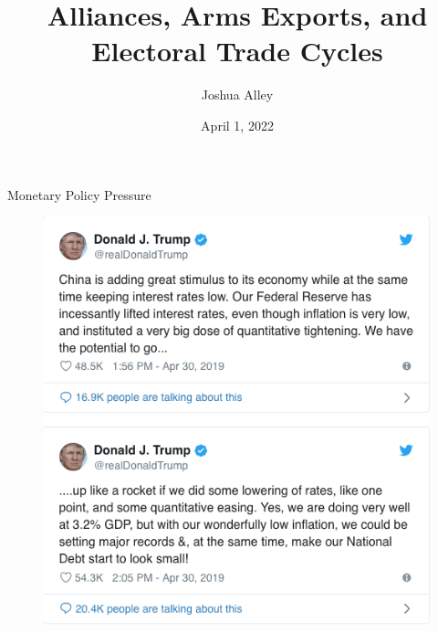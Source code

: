 \documentclass[12pt]{beamer}
\title{Alliances, Arms Exports, and Electoral Trade Cycles}
\date{April 1, 2022}
\author{Joshua Alley}
\institute{Democratic Statecraft Lab, University of Virginia}
\begin{document}
 \maketitle



%
%
%
 

\begin{frame}{Monetary Policy Pressure}

\pause 
\begin{figure}[htbp]
		\includegraphics[height=0.75\textheight]{trump-fed-tweets.png}
\end{figure}

\end{frame}
 
\end{document}
